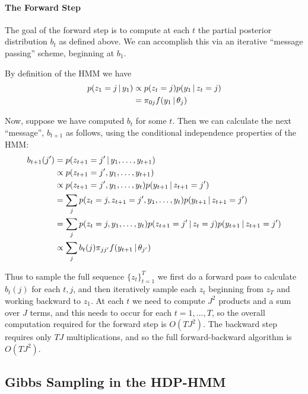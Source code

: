 \paragraph{The Forward Step}
\label{sec:forward-step}

The goal of the forward step is to compute at each $t$ the partial posterior
distribution $b_t$ as defined above.  We can accomplish this via an
iterative ``message passing'' scheme, beginning at $b_1$.

By definition of the HMM we have
\begin{align}
  p(z_1 = j \, \vert \, y_1) &\propto p(z_t = j) p(y_1 \, \vert \, z_t = j) \\
  &= \pi_{0j} f(y_1 \, \vert \, \theta_{j})
\end{align}

Now, suppose we have computed $b_t$ for some $t$.  Then we can
calculate the next ``message'', $b_{t+1}$ as follows, using the conditional independence
properties of the HMM:
\begin{align}
  b_{t+1}(j') &= p(z_{t+1} = j' \, \vert \, y_1, \dots, y_{t+1}) \\
  &\propto p(z_{t+1} = j', y_1, \dots,
  y_{t+1})\\
  &\propto p(z_{t+1} = j', y_1, \dots, y_{t}) p(y_{t+1} \, \vert \, z_{t+1} = j') \\
  &= \sum_{j} p(z_{t} = j, z_{t+1} = j',  y_1, \dots,
  y_{t}) p(y_{t+1} \, \vert \, z_{t+1} = j') \\
  &= \sum_{j} p(z_{t} = j, y_1, \dots, y_{t})
  p(z_{t+1}  = j' \, \vert \, z_{t} = j) p(y_{t+1} \, \vert \, z_{t+1} = j') \\
  &\propto \sum_{j} b_{t}(j) \pi_{jj'} f(y_{t+1} \, \vert \, \theta_{j'})
\end{align}

Thus to sample the full sequence $\{z_t\}_{t=1}^T$ we first do a
forward pass to calculate $b_t(j)$ for each $t,j$, and then
iteratively sample each $z_t$ beginning from $z_T$ and working backward
to $z_1$.  At each $t$ we need to compute $J^2$ products and a sum
over $J$ terms, and this needs to occur for each $t = 1, \dots, T$, so
the overall computation required for the forward step is $O(TJ^2)$.
The backward step requires only $TJ$ multiplications, and so the full
forward-backward algorithm is $O(TJ^2)$.

\subsection{Gibbs Sampling in the HDP-HMM}

